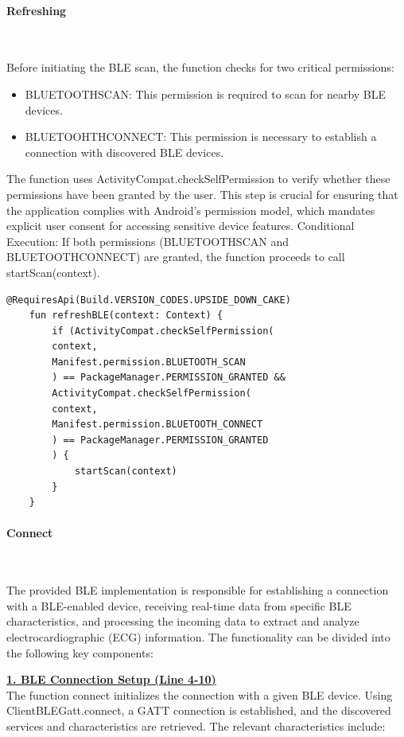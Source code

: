 \paragraph{Refreshing }\mbox{}\\
{\large
	Before initiating the BLE scan, the function checks for two critical permissions:
	\begin{itemize}
		\item BLUETOOTH\textunderscore SCAN: This permission is required to scan for nearby BLE devices.
		\item BLUETOOHTH\textunderscore CONNECT: This permission is necessary to establish a connection with discovered BLE devices.
	\end{itemize}
	
	The function uses ActivityCompat.checkSelfPermission to verify whether these permissions have been granted by the user. This step is crucial for ensuring that the application complies with Android's permission model, which mandates explicit user consent for accessing sensitive device features.
	Conditional Execution:
	If both permissions (BLUETOOTH\textunderscore SCAN and BLUETOOTH\textunderscore CONNECT) are granted, the function proceeds to call startScan(context).
	
	
	
\begin{lstlisting}[label={fig:simpleSourceGen.cs}, caption={Code for refresh functionality}]
	@RequiresApi(Build.VERSION_CODES.UPSIDE_DOWN_CAKE)
	fun refreshBLE(context: Context) {
		if (ActivityCompat.checkSelfPermission(
		context,
		Manifest.permission.BLUETOOTH_SCAN
		) == PackageManager.PERMISSION_GRANTED &&
		ActivityCompat.checkSelfPermission(
		context,
		Manifest.permission.BLUETOOTH_CONNECT
		) == PackageManager.PERMISSION_GRANTED
		) {
			startScan(context)
		}
	}
\end{lstlisting}
\paragraph{Connect}\mbox{}\\
{\large 
	The provided BLE implementation is responsible for establishing a connection with a BLE-enabled device, receiving real-time data from specific BLE characteristics, and processing the incoming data to extract and analyze electrocardiographic (ECG) information. The functionality can be divided into the following key components:
	
	\underline{\textbf{1. BLE Connection Setup (Line 4-10)}}\mbox{}\\
	The function connect initializes the connection with a given BLE device. Using ClientBLEGatt.connect, a GATT connection is established, and the discovered services and characteristics are retrieved. The relevant characteristics include:
	
}}
